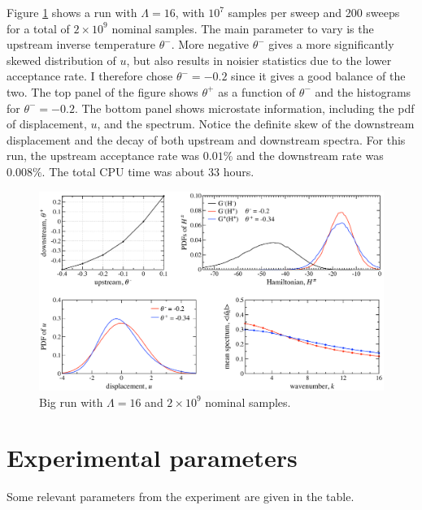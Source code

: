 \documentclass[12pt]{article}
\begin{document}
Figure \ref{Lambda16Run} shows a run with $\Lambda = 16$, with $10^7$ samples per sweep and 200 sweeps for a total of $2 \times 10^9$ nominal samples. The main parameter to vary is the upstream inverse temperature $\theta^-$. More negative $\theta^-$ gives a more significantly skewed distribution of $u$, but also results in noisier statistics due to the lower acceptance rate. I therefore chose $\theta^- = -0.2$ since it gives a good balance of the two. The top panel of the figure shows $\theta^+$ as a function of $\theta^-$ and the histograms for $\theta^- = -0.2$. The bottom panel shows microstate information, including the pdf of displacement, $u$, and the spectrum. Notice the definite skew of the downstream displacement and the decay of both upstream and downstream spectra. For this run, the upstream acceptance rate was $0.01\%$ and the downstream rate was $0.008\%$. The total CPU time was about 33 hours.

\begin{figure}%
\begin{center}
\includegraphics[width = 0.95 \textwidth]{Lambda16Run}
\caption{Big run with $\Lambda = 16$ and $2 \times 10^9$ nominal samples.}
\label{Lambda16Run}
\end{center}
\end{figure}
 
\newpage
\newpage
\section{Experimental parameters}

Some relevant parameters from the experiment are given in the table.
\end{document}
